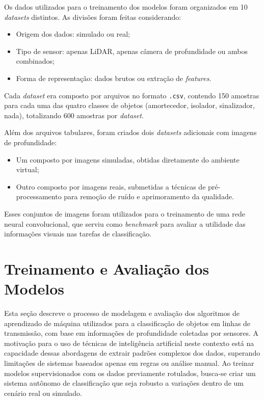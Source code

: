 Os dados utilizados para o treinamento dos modelos foram organizados em 10 \textit{datasets} distintos. As divisões foram feitas considerando:

\begin{itemize}
  \item Origem dos dados: simulado ou real;
  \item Tipo de sensor: apenas LiDAR, apenas câmera de profundidade ou ambos combinados;
  \item Forma de representação: dados brutos ou extração de \textit{features}.
\end{itemize}

Cada \textit{dataset} era composto por arquivos no formato \texttt{.csv}, contendo 150 amostras para cada uma das quatro classes de objetos (amortecedor, isolador, sinalizador, nada), totalizando 600 amostras por \textit{dataset}.

Além dos arquivos tabulares, foram criados dois \textit{datasets} adicionais com imagens de profundidade:

\begin{itemize}
  \item Um composto por imagens simuladas, obtidas diretamente do ambiente virtual;
  \item Outro composto por imagens reais, submetidas a técnicas de pré-processamento para remoção de ruído e aprimoramento da qualidade.
\end{itemize}

Esses conjuntos de imagens foram utilizados para o treinamento de uma rede neural convolucional, que serviu como \textit{benchmark} para avaliar a utilidade das informações visuais nas tarefas de classificação.


\section{Treinamento e Avaliação dos Modelos}

Esta seção descreve o processo de modelagem e avaliação dos algoritmos de aprendizado de máquina utilizados para a classificação de objetos em linhas de transmissão, com base em informações de profundidade coletadas por sensores. A motivação para o uso de técnicas de inteligência artificial neste contexto está na capacidade dessas abordagens de extrair padrões complexos dos dados, superando limitações de sistemas baseados apenas em regras ou análise manual. Ao treinar modelos supervisionados com os dados previamente rotulados, busca-se criar um sistema autônomo de classificação que seja robusto a variações dentro de um cenário real ou simulado.

